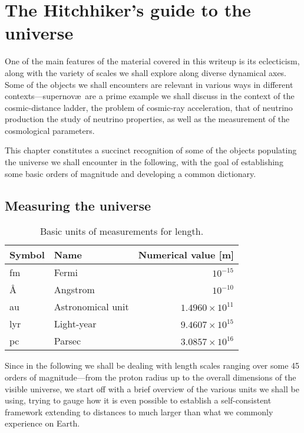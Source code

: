 \chapter{The Hitchhiker's guide to the universe}
\label{chap:universe}


One of the main features of the material covered in this writeup is its eclecticism,
along with the variety of scales we shall explore along diverse dynamical axes.
Some of the objects we shall encounters are relevant in various ways in different
contexts---supernov\ae~are a prime example we shall discuss in the context of the
cosmic-distance ladder, the problem of cosmic-ray acceleration, that of neutrino
production the study of neutrino properties, as well as the measurement of the
cosmological parameters.

This chapter constitutes a succinct recognition of some of the objects populating
the universe we shall encounter in the following, with the goal of establishing
some basic orders of magnitude and developing a common dictionary.


\section{Measuring the universe}
\label{sec:cosmic_ladder}

\begin{table}[htb!]
  \begin{tabular}{llr}
    \hline
    Symbol & Name & Numerical value [m]\\
    \hline
    \hline
    fm & Fermi & $10^{-15}$\\
    \AA & Angstrom & $10^{-10}$\\
    au & Astronomical unit & $1.4960 \times 10^{11}$\\
    lyr & Light-year & $9.4607 \times 10^{15}$\\
    pc & Parsec & $3.0857 \times 10^{16}$\\
    \hline
  \end{tabular}
  \label{tab:length_units}
  \caption{Basic units of measurements for length.}
\end{table}

Since in the following we shall be dealing with length scales ranging over some
45 orders of magnitude---from the proton radius up to the overall dimensions of
the visible universe, we start off with a brief overview of the various units we
shall be using, trying to gauge how it is even possible to establish a self-consistent
framework extending to distances to much larger than what we commonly experience
on Earth.

